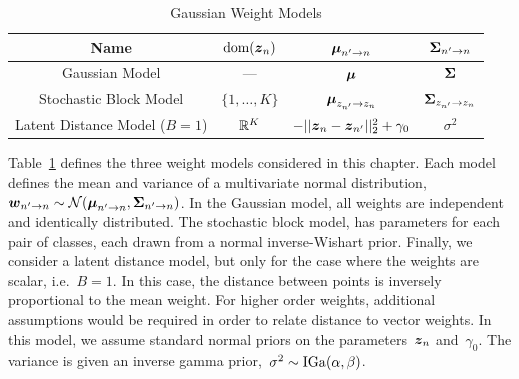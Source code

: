 \begin{table}
\begin{center}
\begin{tabular}{c|c|c|c}
Name & $\text{dom}(\boldsymbol{z}_n)$ & $\boldsymbol{\mu}_{n' \to n}$ & $\boldsymbol{\Sigma}_{n' \to n}$\\
\hline
Gaussian Model & --- & $\boldsymbol{\mu}$ & $\boldsymbol{\Sigma}$ \\
Stochastic Block Model & $\{1, \ldots, K\}$ & $\boldsymbol{\mu}_{z_{n'} \to z_n}$ & $\boldsymbol{\Sigma}_{z_{n'} \to z_n}$ \\
Latent Distance Model (${B=1}$) & $\mathbb{R}^K $ & $-||\boldsymbol{z}_n - \boldsymbol{z}_{n'}||_2^2 + \gamma_0$ & $\sigma^2$
\end{tabular}
\end{center}
\caption{Gaussian Weight Models}
\label{tab:gauss_W_models}
\end{table}

Table~\ref{tab:gauss_W_models} defines the three weight models considered in this chapter.  
Each model defines the mean and variance of a multivariate
normal distribution,~${\boldsymbol{w}_{n' \to n} \sim \mathcal{N}(\boldsymbol{\mu}_{n' \to
  n}, \boldsymbol{\Sigma}_{n' \to n})}$.  In the Gaussian model, all weights are
independent and identically distributed.  The stochastic block model,
has parameters for each pair of classes, each drawn from a normal
inverse-Wishart prior. Finally, we
consider a latent distance model, but only for the case where the
weights are scalar, i.e.~$B=1$. In this case, the distance between
points is inversely proportional to the mean weight.  For higher order
weights, additional assumptions would be required in order to relate
distance to vector weights. In this model, we assume standard normal
priors on the parameters~$\boldsymbol{z}_n$ and~$\gamma_0$.  The variance is given
an inverse gamma prior,~$\sigma^2 \sim \mathrm{IGa}(\alpha, \beta)$.


